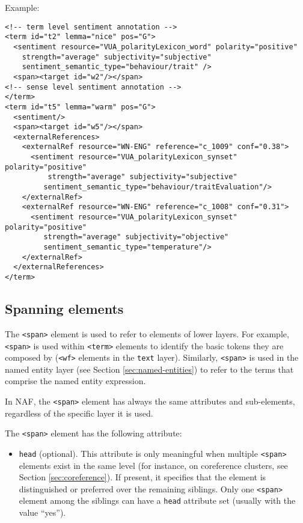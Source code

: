 Example:
\begin{Verbatim}[fontsize=\small]
<!-- term level sentiment annotation -->
<term id="t2" lemma="nice" pos="G">
  <sentiment resource="VUA_polarityLexicon_word" polarity="positive"
    strength="average" subjectivity="subjective"
    sentiment_semantic_type="behaviour/trait" />
  <span><target id="w2"/></span>
<!-- sense level sentiment annotation -->
</term>
<term id="t5" lemma="warm" pos="G">
  <sentiment/>
  <span><target id="w5"/></span>
  <externalReferences>
    <externalRef resource="WN-ENG" reference="c_1009" conf="0.38">
      <sentiment resource="VUA_polarityLexicon_synset" polarity="positive"
          strength="average" subjectivity="subjective"
         sentiment_semantic_type="behaviour/traitEvaluation"/>
    </externalRef>
    <externalRef resource="WN-ENG" reference="c_1008" conf="0.31">
      <sentiment resource="VUA_polarityLexicon_synset" polarity="positive"
         strength="average" subjectivity="objective"
         sentiment_semantic_type="temperature"/>
    </externalRef>
  </externalReferences>
</term>
\end{Verbatim}

\subsection{Spanning elements}
\label{sec:span}

The \texttt{<span>} element is used to refer to elements of lower
layers. For example, \texttt{<span>} is used within \texttt{<term>} elements
to identify the basic tokens they are composed by (\texttt{<wf>} elements in
the \texttt{text} layer). Similarly, \texttt{<span>} is used in the named
entity layer (see Section \ref{sec:named-entities}) to refer to the terms
that comprise the named entity expression.

In NAF, the \texttt{<span>} element has always the same attributes and
sub-elements, regardless of the specific layer it is used. 

\noindent The \texttt{<span>} element has the following attribute:
\begin{itemize}
\item \texttt{head} (optional). This attribute is only meaningful when
  multiple \texttt{<span>} elements exist in the same level (for instance,
  on coreference clusters, see Section \ref{sec:coreference}). If present,
  it specifies that the element is distinguished or preferred over the
  remaining siblings. Only one \texttt{<span>} element among the siblings
  can have a \texttt{head} attribute set (usually with the value ``yes'').
\end{itemize}

